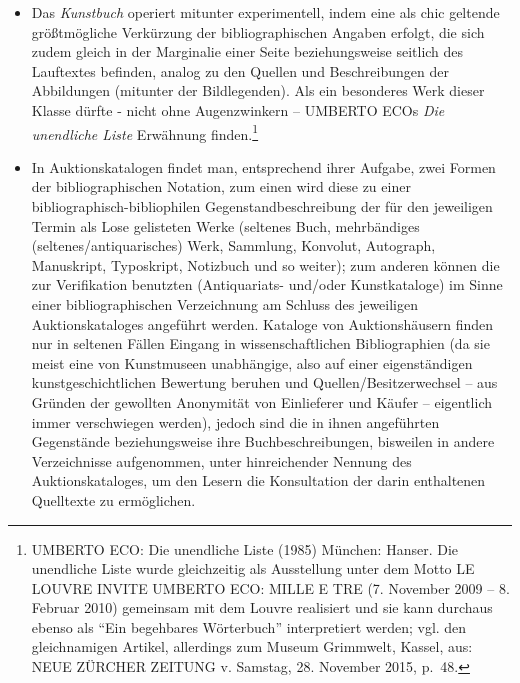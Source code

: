 \documentclass[a4paper,
fontsize=11pt,
oneside,
numbers=noperiodatend,
parskip=half-,
bibliography=totoc,
final
]{scrartcl}
\begin{document}
\begin{itemize}
  Einführung / Nachwort des Herausgebers bedacht.\footnote{Vgl. etwa
    folgende mit dem Formschlagwort Anthologie versehene Ausgabe: HERWIG
    GÖRGEMANNS (Hsgr.): Die Griechische Literatur in Text und
    Darstellung, 5 Bde. (1998 /20042) Stuttgart: Reclam.}
\item
  Das \emph{Kunstbuch} operiert mitunter experimentell, indem eine als
  chic geltende größtmögliche Verkürzung der bibliographischen Angaben
  erfolgt, die sich zudem gleich in der Marginalie einer Seite
  beziehungsweise seitlich des Lauftextes befinden, analog zu den
  Quellen und Beschreibungen der Abbildungen (mitunter der
  Bildlegenden). Als ein besonderes Werk dieser Klasse dürfte - nicht
  ohne Augenzwinkern -- UMBERTO ECOs \emph{Die unendliche Liste}
  Erwähnung finden.\footnote{UMBERTO ECO: Die unendliche Liste (1985)
    München: Hanser. Die unendliche Liste wurde gleichzeitig als
    Ausstellung unter dem Motto LE LOUVRE INVITE UMBERTO ECO: MILLE E
    TRE (7. November 2009 -- 8. Februar 2010) gemeinsam mit dem Louvre
    realisiert und sie kann durchaus ebenso als \enquote{Ein begehbares
    Wörterbuch} interpretiert werden; vgl. den gleichnamigen Artikel,
    allerdings zum Museum Grimmwelt, Kassel, aus: NEUE ZÜRCHER ZEITUNG
    v. Samstag, 28. November 2015, p.~48.}
\item
  In Auktionskatalogen findet man, entsprechend ihrer Aufgabe, zwei
  Formen der bibliographischen Notation, zum einen wird diese zu einer
  bibliographisch-bibliophilen Gegenstandbeschreibung der für den
  jeweiligen Termin als Lose gelisteten Werke (seltenes Buch,
  mehrbändiges (seltenes/antiquarisches) Werk, Sammlung, Konvolut,
  Autograph, Manuskript, Typoskript, Notizbuch und so weiter); zum
  anderen können die zur Verifikation benutzten (Antiquariats- und/oder
  Kunstkataloge) im Sinne einer bibliographischen Verzeichnung am
  Schluss des jeweiligen Auktionskataloges angeführt werden. Kataloge
  von Auktionshäusern finden nur in seltenen Fällen Eingang in
  wissenschaftlichen Bibliographien (da sie meist eine von Kunstmuseen
  unabhängige, also auf einer eigenständigen kunstgeschichtlichen
  Bewertung beruhen und Quellen/Besitzerwechsel -- aus Gründen der
  gewollten Anonymität von Einlieferer und Käufer -- eigentlich immer
  verschwiegen werden), jedoch sind die in ihnen angeführten Gegenstände
  beziehungsweise ihre Buchbeschreibungen, bisweilen in andere
  Verzeichnisse aufgenommen, unter hinreichender Nennung des
  Auktionskataloges, um den Lesern die Konsultation der darin
  enthaltenen Quelltexte zu ermöglichen.
\end{itemize}
\end{document}
